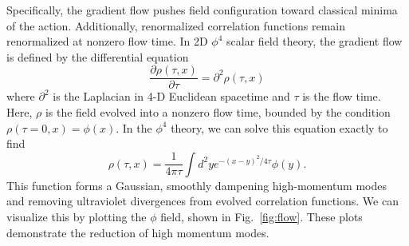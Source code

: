 \documentclass[12pt]{report}
\begin{document}
Specifically, the gradient flow pushes field configuration toward classical minima of the action. Additionally, renormalized correlation functions remain renormalized at nonzero flow time.\cite{luscher2013} In 2D $\phi^4$ scalar field theory, the gradient flow is defined by the differential equation 
\begin{equation}
    \frac{\partial \rho(\tau, x)}{\partial \tau} = \partial^2 \rho(\tau,x)
\end{equation}
where $\partial^2$ is the Laplacian in 4-D Euclidean spacetime and $\tau$ is the flow time. Here, $\rho$ is the field evolved into a nonzero flow time, bounded by the condition $\rho(\tau=0,x) = \phi(x)$. In the $\phi^4$ theory, we can solve this equation exactly to find \cite{monahan2016}
\begin{equation}
    \rho(\tau, x) = \frac{1}{4 \pi \tau} \int d^2 y e^{-(x-y)^2/4\tau} \phi(y).
\end{equation}
This function forms a Gaussian, smoothly dampening high-momentum modes and removing ultraviolet divergences from evolved correlation functions.\cite{makino2015a} We can visualize this by plotting the $\phi$ field, shown in Fig.~\ref{fig:flow}. These plots demonstrate the reduction of high momentum modes.
\end{document}
